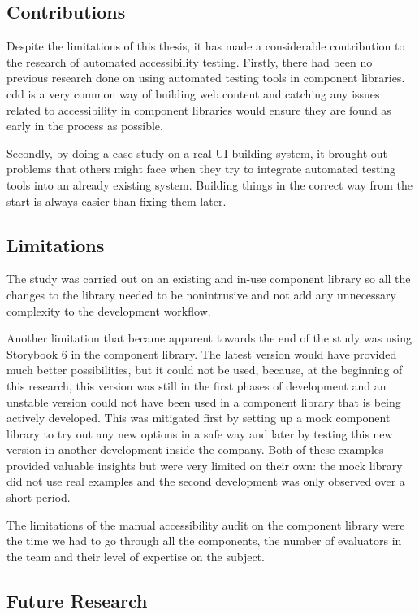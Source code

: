 \documentclass{master_thesis}
\begin{document}
\subsection{Contributions}

Despite the limitations of this thesis, it has made a considerable contribution to the research of automated accessibility testing. Firstly, there had been no previous research done on using automated testing tools in component libraries. \ac{cdd} is a very common way of building web content and catching any issues related to accessibility in component libraries would ensure they are found as early in the process as possible.

Secondly, by doing a case study on a real UI building system, it brought out problems that others might face when they try to integrate automated testing tools into an already existing system. Building things in the correct way from the start is always easier than fixing them later.

\subsection{Limitations}

The study was carried out on an existing and in-use component library so all the changes to the library needed to be nonintrusive and not add any unnecessary complexity to the development workflow.

Another limitation that became apparent towards the end of the study was using Storybook 6 in the component library. The latest version would have provided much better possibilities, but it could not be used, because, at the beginning of this research, this version was still in the first phases of development and an unstable version could not have been used in a component library that is being actively developed. This was mitigated first by setting up a mock component library to try out any new options in a safe way and later by testing this new version in another development inside the company. Both of these examples provided valuable insights but were very limited on their own: the mock library did not use real examples and the second development was only observed over a short period.

The limitations of the manual accessibility audit on the component library were the time we had to go through all the components, the number of evaluators in the team and their level of expertise on the subject.

\subsection{Future Research}
\end{document}
